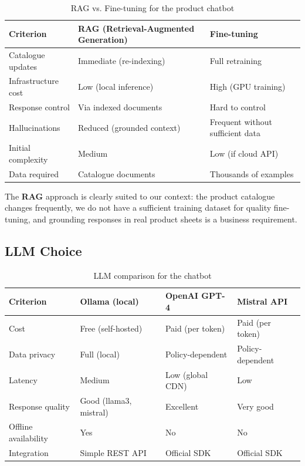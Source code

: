 \begin{table}[H]
\centering
\caption{RAG vs. Fine-tuning for the product chatbot}
\begin{tabularx}{\textwidth}{|l|X|X|}
\hline
\rowcolor{gray!20}
\textbf{Criterion} & \textbf{RAG (Retrieval-Augmented Generation)} & \textbf{Fine-tuning} \\
\hline
Catalogue updates & \cellcolor{green!15}Immediate (re-indexing) & Full retraining \\
\hline
Infrastructure cost & \cellcolor{green!15}Low (local inference) & High (GPU training) \\
\hline
Response control & \cellcolor{green!15}Via indexed documents & Hard to control \\
\hline
Hallucinations & \cellcolor{green!15}Reduced (grounded context) & Frequent without sufficient data \\
\hline
Initial complexity & Medium & \cellcolor{green!15}Low (if cloud API) \\
\hline
Data required & \cellcolor{green!15}Catalogue documents & Thousands of examples \\
\hline
\end{tabularx}
\end{table}

The \textbf{RAG} approach is clearly suited to our context:
the product catalogue changes frequently, we do not have a sufficient training
dataset for quality fine-tuning, and grounding responses in real product sheets
is a business requirement.

\subsection{LLM Choice}

\begin{table}[H]
\centering
\caption{LLM comparison for the chatbot}
\begin{tabularx}{\textwidth}{|l|X|X|X|}
\hline
\rowcolor{gray!20}
\textbf{Criterion} & \textbf{Ollama (local)} & \textbf{OpenAI GPT-4} & \textbf{Mistral API} \\
\hline
Cost & \cellcolor{green!15}Free (self-hosted) & Paid (per token) & Paid (per token) \\
\hline
Data privacy & \cellcolor{green!15}Full (local) & Policy-dependent & Policy-dependent \\
\hline
Latency & Medium & \cellcolor{green!15}Low (global CDN) & Low \\
\hline
Response quality & Good (llama3, mistral) & \cellcolor{green!15}Excellent & Very good \\
\hline
Offline availability & \cellcolor{green!15}Yes & No & No \\
\hline
Integration & \cellcolor{green!15}Simple REST API & Official SDK & Official SDK \\
\hline
\end{tabularx}
\end{table}

